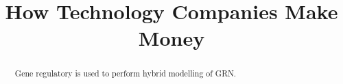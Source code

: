 \documentclass[twocolumn]{bmcart}%
\begin{document}
\begin{frontmatter}

\begin{fmbox}


\title{How Technology Companies Make Money}


\author[
   email={sh3g12@soton.ac.uk}   %
]{ }



\begin{abstractbox}

\begin{abstract} %
Gene regulatory \cite{winterman-kelly-online-shopper} is used to perform hybrid modelling of GRN.
\end{abstract}

\end{abstractbox}
%
\end{fmbox}%

\end{frontmatter}
\end{document}
